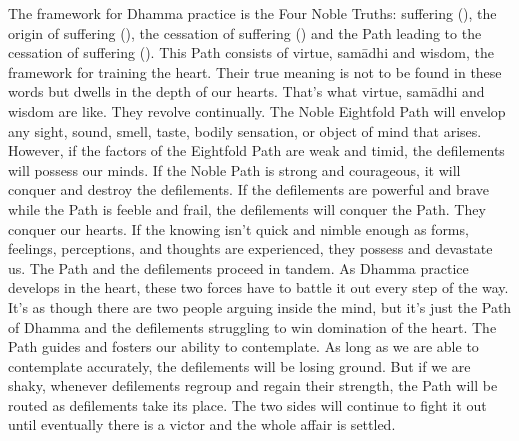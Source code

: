 The framework for Dhamma practice is the Four Noble Truths: suffering (), the origin of suffering (), the cessation of suffering () and the Path leading to the cessation of suffering (). This Path consists of virtue, sam\=adhi and wisdom, the framework for training the heart. Their true meaning is not to be found in these words but dwells in the depth of our hearts. That's what virtue, sam\=adhi and wisdom are like. They revolve continually. The Noble Eightfold Path will envelop any sight, sound, smell, taste, bodily sensation, or object of mind that arises. However, if the factors of the Eightfold Path are weak and timid, the defilements will possess our minds. If the Noble Path is strong and courageous, it will conquer and destroy the defilements. If the defilements are powerful and brave while the Path is feeble and frail, the defilements will conquer the Path. They conquer our hearts. If the knowing isn't quick and nimble enough as forms, feelings, perceptions, and thoughts are experienced, they possess and devastate us. The Path and the defilements proceed in tandem. As Dhamma practice develops in the heart, these two forces have to battle it out every step of the way. It's as though there are two people arguing inside the mind, but it's just the Path of Dhamma and the defilements struggling to win domination of the heart. The Path guides and fosters our ability to contemplate. As long as we are able to contemplate accurately, the defilements will be losing ground. But if we are shaky, whenever defilements regroup and regain their strength, the Path will be routed as defilements take its place. The two sides will continue to fight it out until eventually there is a victor and the whole affair is settled.

